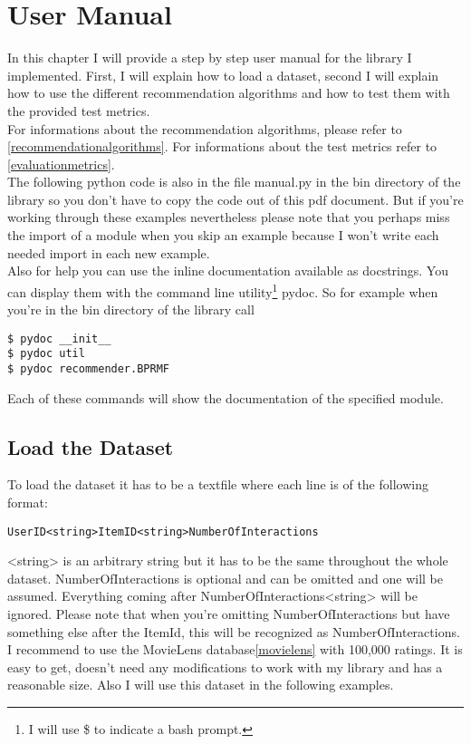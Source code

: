 \chapter{User Manual}
In this chapter I will provide a step by step user manual for the library I implemented\cite{recsyslab}.
First, I will explain how to load a dataset, second I
will explain how to use the different recommendation algorithms and
how to test them with the provided test metrics. \\
For informations about the recommendation algorithms, please refer to \ref{recommendationalgorithms}.
For informations about the test metrics refer to \ref{evaluationmetrics}.\\
The following python code is also in the file manual.py in the bin directory of the library
so you don't have to copy the code out of this pdf document. But if you're working through these examples
nevertheless please note that you perhaps miss the import of a module when you skip an example because
I won't write each needed import in each new example.\\
Also for help you can use the inline documentation available as docstrings.
You can display them with the command line utility\footnote{I will use \$ to indicate a bash prompt.} pydoc.
So for example when you're in the bin directory of the library call

\begin{lstlisting}
$ pydoc __init__
$ pydoc util 
$ pydoc recommender.BPRMF
\end{lstlisting}

Each of these commands will show the documentation of the specified module.


\section{Load the Dataset}
To load the dataset it has to be a textfile where each line is of the following format:
\begin{lstlisting}
UserID<string>ItemID<string>NumberOfInteractions
\end{lstlisting}
<string> is an arbitrary string but it has to be the same throughout the whole dataset.
NumberOfInteractions is optional and can be omitted and one will be assumed.
Everything coming after NumberOfInteractions<string> will be ignored.
Please note that when you're omitting NumberOfInteractions but have something else after
the ItemId, this will be recognized as NumberOfInteractions.
I recommend to use the MovieLens database\ref{movielens} with 100,000 ratings.
It is easy to get, doesn't need any modifications to work with my library and has a
reasonable size. Also I will use this dataset in the following examples.

